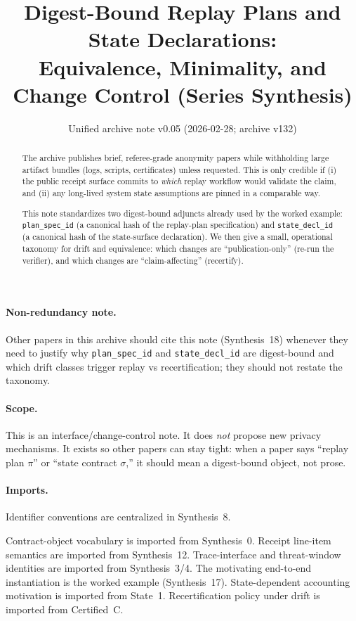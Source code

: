 \documentclass[11pt]{article}
\title{Digest-Bound Replay Plans and State Declarations:\\
\large Equivalence, Minimality, and Change Control (Series Synthesis)}
\author{}
\date{Unified archive note v0.05 (2026-02-28; archive v132)}
\begin{document}
\maketitle

\begin{abstract}
The archive publishes brief, referee-grade anonymity papers while withholding large artifact bundles (logs, scripts, certificates) unless requested.
This is only credible if (i) the public receipt surface commits to \emph{which} replay workflow would validate the claim, and (ii) any long-lived system state assumptions are pinned in a comparable way.

This note standardizes two digest-bound adjuncts already used by the worked example:
\texttt{plan\_spec\_id} (a canonical hash of the replay-plan specification) and \texttt{state\_decl\_id} (a canonical hash of the state-surface declaration).
We then give a small, operational taxonomy for drift and equivalence:
which changes are ``publication-only'' (re-run the verifier), and which changes are ``claim-affecting'' (recertify).
\end{abstract}

\paragraph{Non-redundancy note.}
Other papers in this archive should cite this note (Synthesis~18) whenever they need to justify why \texttt{plan\_spec\_id} and \texttt{state\_decl\_id} are digest-bound and which drift classes trigger replay vs recertification; they should not restate the taxonomy.

\paragraph{Scope.}
This is an interface/change-control note.
It does \emph{not} propose new privacy mechanisms.
It exists so other papers can stay tight:
when a paper says ``replay plan $\pi$'' or ``state contract $\sigma$,'' it should mean a digest-bound object, not prose.

\paragraph{Imports.}
Identifier conventions are centralized in Synthesis~8.\cite{series:notation}

Contract-object vocabulary is imported from Synthesis~0.\cite{series:contractobjects}
Receipt line-item semantics are imported from Synthesis~12.\cite{series:receiptitems}
Trace-interface and threat-window identities are imported from Synthesis~3/4.\cite{series:traceifaces,series:threatwindows}
The motivating end-to-end instantiation is the worked example (Synthesis~17).\cite{series:workedexample}
State-dependent accounting motivation is imported from State~1.\cite{series:state1}
Recertification policy under drift is imported from Certified~C.\cite{series:recert}
\end{document}
